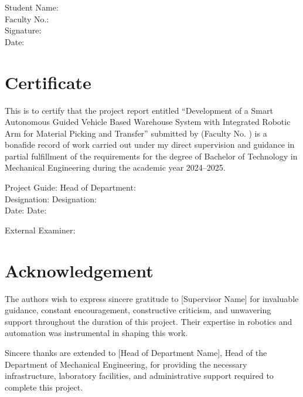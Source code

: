 \documentclass[12pt,a4paper,oneside]{report}
\begin{document}
\vspace{2cm}
\noindent Student Name:\\
Faculty No.:\\
Signature:\\
Date:

\newpage

\chapter*{Certificate}

This is to certify that the project report entitled ``Development of a Smart Autonomous Guided Vehicle Based Warehouse System with Integrated Robotic Arm for Material Picking and Transfer'' submitted by \underline{\hspace{3cm}} (Faculty No. \underline{\hspace{2cm}}) is a bonafide record of work carried out under my direct supervision and guidance in partial fulfillment of the requirements for the degree of Bachelor of Technology in Mechanical Engineering during the academic year 2024--2025.

\vspace{2cm}
\noindent Project Guide: \hfill Head of Department:\\
Designation: \hfill Designation:\\
Date: \hfill Date:

\vspace{2cm}
\noindent External Examiner:

\newpage

\chapter*{Acknowledgement}

The authors wish to express sincere gratitude to [Supervisor Name] for invaluable guidance, constant encouragement, constructive criticism, and unwavering support throughout the duration of this project. Their expertise in robotics and automation was instrumental in shaping this work.

Sincere thanks are extended to [Head of Department Name], Head of the Department of Mechanical Engineering, for providing the necessary infrastructure, laboratory facilities, and administrative support required to complete this project.
\end{document}
